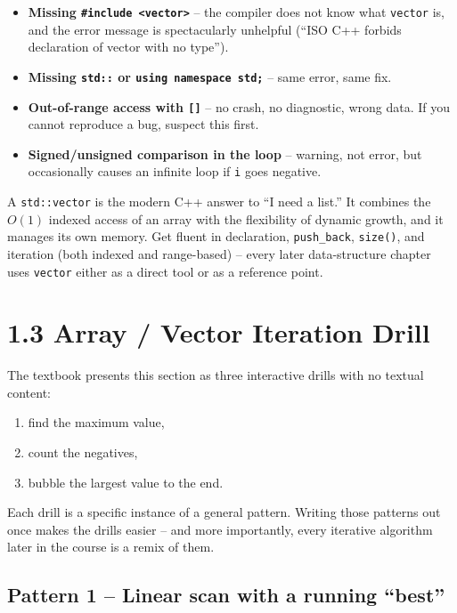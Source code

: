 \documentclass[11pt]{article}
\begin{document}
\begin{itemize}
    \item \textbf{Missing \texttt{\#include <vector>}} -- the compiler
          does not know what \texttt{vector} is, and the error message
          is spectacularly unhelpful (``ISO C++ forbids declaration of
          vector with no type'').
    \item \textbf{Missing \texttt{std::} or \texttt{using namespace std;}}
          -- same error, same fix.
    \item \textbf{Out-of-range access with \texttt{[]}} -- no crash, no
          diagnostic, wrong data. If you cannot reproduce a bug,
          suspect this first.
    \item \textbf{Signed/unsigned comparison in the loop} -- warning,
          not error, but occasionally causes an infinite loop if
          \texttt{i} goes negative.
\end{itemize}

\begin{ideabox}
A \texttt{std::vector} is the modern C++ answer to ``I need a list.''
It combines the $O(1)$ indexed access of an array with the flexibility
of dynamic growth, and it manages its own memory. Get fluent in
declaration, \texttt{push\_back}, \texttt{size()}, and iteration (both
indexed and range-based) -- every later data-structure chapter uses
\texttt{vector} either as a direct tool or as a reference point.
\end{ideabox}

\section{1.3 Array / Vector Iteration Drill}

The textbook presents this section as three interactive drills with no
textual content:
\begin{enumerate}
    \item find the maximum value,
    \item count the negatives,
    \item bubble the largest value to the end.
\end{enumerate}
Each drill is a specific instance of a general pattern. Writing those
patterns out once makes the drills easier -- and more importantly,
every iterative algorithm later in the course is a remix of them.

\subsection{Pattern 1 -- Linear scan with a running ``best''}
\end{document}
